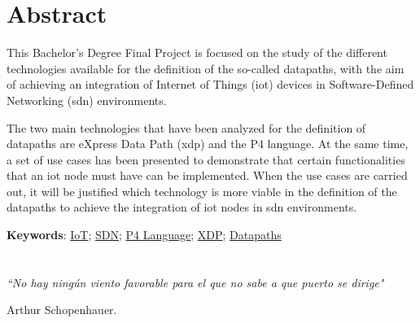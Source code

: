 \cleardoublepage %



\chapter{Abstract}
\thispagestyle{empty}

This Bachelor's Degree Final Project is focused on the study of the different technologies available for the definition of the so-called datapaths, with the aim of achieving an integration of Internet of Things (\gls{iot}) devices in Software-Defined Networking (\gls{sdn}) environments. \newline

The two main technologies that have been analyzed for the definition of datapaths are
eXpress Data Path (\gls{xdp}) and the P4 language. At the same time, a set of use cases has been presented to demonstrate that certain functionalities that an \gls{iot} node must have can be implemented. When the use cases are carried out, it will be justified which technology is more viable in the definition of the datapaths to achieve the integration of \gls{iot} nodes in \gls{sdn} environments.

\vspace{1cm}

\textbf{Keywords}: \href{https://scholar.google.es/scholar?q=Internet+of+Things}{IoT}; \href{https://www.opennetworking.org/sdn-definition}{SDN};
\href{https://p4.org/}{P4 Language}; \href{https://scholar.google.es/scholar?q=XDP+linux}{XDP};
\href{https://scholar.google.es/scholar?q=Datapaths}{Datapaths}



\cleardoublepage %




\chapter*{}
\setlength{\leftmargin}{0.5\textwidth}
\setlength{\parsep}{0cm}
\addtolength{\topsep}{0.5cm}
\begin{flushright}
	\small\em{
		``No hay ningún viento favorable para el que no sabe a que puerto se dirige"
	}
\end{flushright}
\begin{flushright}
	\small{
		Arthur Schopenhauer.
	}
\end{flushright}
\cleardoublepage %
